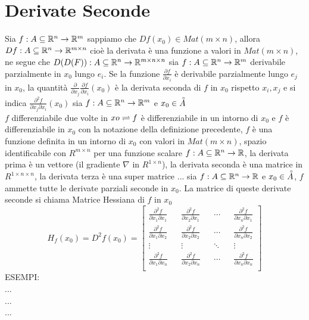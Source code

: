 \section{Derivate Seconde}
Sia $f:A\subseteq \mathbb{R}^n \rightarrow \mathbb{R}^m$ sappiamo che $Df(x_0)\in Mat(m\times n)$, allora $Df:A\subseteq \mathbb{R}^{n} \rightarrow \mathbb{R}^{m\times n}$ cioè la derivata è una funzione a valori in $Mat(m\times n)$, ne segue che $D(D(F)):A\subseteq \mathbb{R}^n \rightarrow \mathbb{R}^{m\times n\times n}$
sia $f:A\subseteq \mathbb{R}^n \rightarrow \mathbb{R}^m$ derivabile parzialmente in $x_0$ lungo $e_i$. Se la funzione $\frac{\partial{f}}{\partial{x_i}}$ è derivabile parzialmente lungo $e_j$ in $x_0$, la quantità $\frac{\partial}{\partial{x_j}}\frac{\partial{f}}{\partial{x_i}}(x_0)$ è la derivata seconda di $f$ in $x_0$ rispetto $x_i,x_j$ e si indica $\frac{\partial^2f}{\partial{x_j}\partial{x_i}}(x_0)$
sia $f:A\subseteq \mathbb{R}^n \rightarrow \mathbb{R}^m$ e $x_0\in\accentset{\circ}{A}$\\
$f$ differenziabile due volte in $xo \rightleftharpoons f$ è differenziabile in un intorno di $x_0$ e $f$ è differenziabile in $x_0$
\observation
con la notazione della definizione precedente, $f$ è una funzione definita in un intorno di $x_0$ con valori in $Mat(m\times n)$, spazio identificabile con $R^{m\times n}$
\observation
per una funzione scalare $f:A\subseteq \mathbb{R}^n \rightarrow \mathbb{R}$, la derivata prima è un vettore (il gradiente $\nabla$ in $R^{1\times n}$), la derivata seconda è una matrice in $R^{1\times n \times n}$, la derivata terza è una super matrice ...
sia $f:A\subseteq \mathbb{R}^n \rightarrow \mathbb{R}$ e $x_0\in\accentset{\circ}{A}$, $f$ ammette tutte le derivate parziali seconde in $x_0$. La matrice di queste derivate seconde si chiama Matrice Hessiana di $f$ in $x_0$
$$H_f(x_0)=D^2f(x_0) = \begin{bmatrix}
\frac{\partial^2f}{\partial{x_1}\partial{x_1}} && \frac{\partial^2f}{\partial{x_2}\partial{x_1}} && \dotsb && \frac{\partial^2f}{\partial{x_n}\partial{x_1}} \\
\frac{\partial^2f}{\partial{x_1}\partial{x_2}} && \frac{\partial^2f}{\partial{x_2}\partial{x_2}} && \dotsb && \frac{\partial^2f}{\partial{x_n}\partial{x_2}} \\
\vdots && \vdots && \ddots && \vdots \\
\frac{\partial^2f}{\partial{x_1}\partial{x_n}} && \frac{\partial^2f}{\partial{x_2}\partial{x_n}} && \dotsb && \frac{\partial^2f}{\partial{x_n}\partial{x_n}} \\
\end{bmatrix}$$ 
ESEMPI:\\
...\\
...\\
...\\

